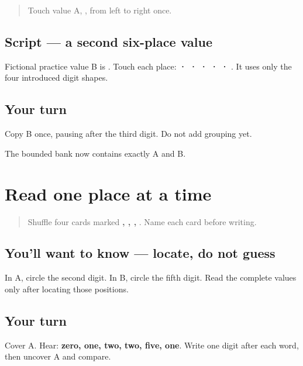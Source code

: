 \label{lesson:PA-W08-phone-b}



\begin{quote}
Touch value A, \textbf{}, from left to right once.
\end{quote}

\subsection*{Script — a second six-place value}
Fictional practice value B is \textbf{}. Touch each place: \textbf{ ·  ·  ·  ·  · }. It uses only the four introduced digit shapes.

\subsection*{Your turn}
Copy B once, pausing after the third digit. Do not add grouping yet.

\begin{tcolorbox}[breakable,colback=teal!4,colframe=teal!35!black,title={Before you move on}]
The bounded bank now contains exactly A and B.
\end{tcolorbox}
\section[\texorpdfstring{\pa{੦} · \pa{੧} · \pa{੨} · \pa{੫} (zero, one, two, five)}{੦ · ੧ · ੨ · ੫ (zero, one, two, five)}]{Read one place at a time}

\label{lesson:PA-W08-digit-recognition}



\begin{quote}
Shuffle four cards marked \textbf{, , , }. Name each card before writing.
\end{quote}

\subsection*{You'll want to know — locate, do not guess}
In A, circle the second digit. In B, circle the fifth digit. Read the complete values only after locating those positions.

\subsection*{Your turn}
Cover A. Hear: \textbf{zero, one, two, two, five, one}. Write one digit after each word, then uncover A and compare.


